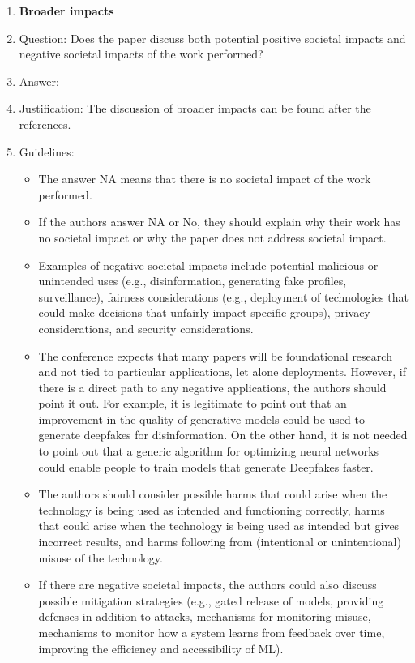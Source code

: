 \documentclass{article}
\theoremstyle{remark}
\begin{document}
\begin{enumerate}
\item {\bf Broader impacts}
    \item[] Question: Does the paper discuss both potential positive societal impacts and negative societal impacts of the work performed?
    \item[] Answer: \answerYes{} %
    \item[] Justification: The discussion of broader impacts can be found after the references.
    \item[] Guidelines:
    \begin{itemize}
        \item The answer NA means that there is no societal impact of the work performed.
        \item If the authors answer NA or No, they should explain why their work has no societal impact or why the paper does not address societal impact.
        \item Examples of negative societal impacts include potential malicious or unintended uses (e.g., disinformation, generating fake profiles, surveillance), fairness considerations (e.g., deployment of technologies that could make decisions that unfairly impact specific groups), privacy considerations, and security considerations.
        \item The conference expects that many papers will be foundational research and not tied to particular applications, let alone deployments. However, if there is a direct path to any negative applications, the authors should point it out. For example, it is legitimate to point out that an improvement in the quality of generative models could be used to generate deepfakes for disinformation. On the other hand, it is not needed to point out that a generic algorithm for optimizing neural networks could enable people to train models that generate Deepfakes faster.
        \item The authors should consider possible harms that could arise when the technology is being used as intended and functioning correctly, harms that could arise when the technology is being used as intended but gives incorrect results, and harms following from (intentional or unintentional) misuse of the technology.
        \item If there are negative societal impacts, the authors could also discuss possible mitigation strategies (e.g., gated release of models, providing defenses in addition to attacks, mechanisms for monitoring misuse, mechanisms to monitor how a system learns from feedback over time, improving the efficiency and accessibility of ML).
    \end{itemize}
    

\end{enumerate}
\end{document}
